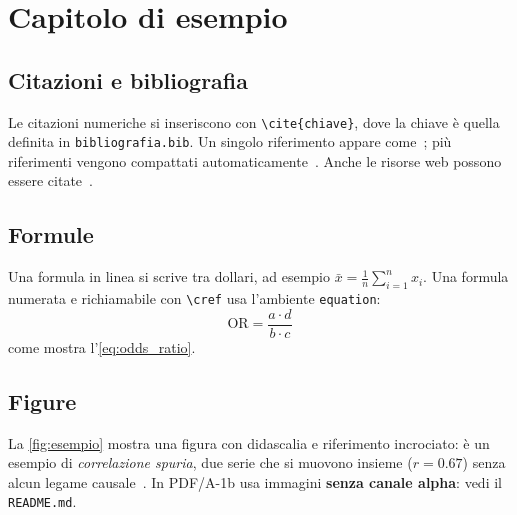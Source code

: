 \chapter{Capitolo di esempio}
\label{cap:esempio}

\section{Citazioni e bibliografia}
\label{sec:citazioni}

Le citazioni numeriche si inseriscono con \verb|\cite{chiave}|, dove la chiave
\`e quella definita in \texttt{bibliografia.bib}. Un singolo riferimento appare
come~\cite{wilkinson_fair_2016}; pi\`u riferimenti vengono compattati
automaticamente~\cite{lamport_latex_1994,knuth_texbook_1984}. Anche le risorse
web possono essere citate~\cite{ctan_biblatex}.

\section{Formule}
\label{sec:formule}

Una formula in linea si scrive tra dollari, ad esempio $\bar{x} = \frac{1}{n}\sum_{i=1}^{n} x_i$.
Una formula numerata e richiamabile con \verb|\cref| usa l'ambiente \texttt{equation}:
\begin{equation}
  \mathrm{OR} = \frac{a \cdot d}{b \cdot c}
  \label{eq:odds_ratio}
\end{equation}
come mostra l'\cref{eq:odds_ratio}.

\section{Figure}
\label{sec:figure}

La \cref{fig:esempio} mostra una figura con didascalia e riferimento incrociato:
\`e un esempio di \emph{correlazione spuria}, due serie che si muovono insieme
($r = 0.67$) senza alcun legame causale~\cite{vigen_spurious_2024}. In PDF/A-1b usa
immagini \textbf{senza canale alpha}: vedi il \texttt{README.md}.

